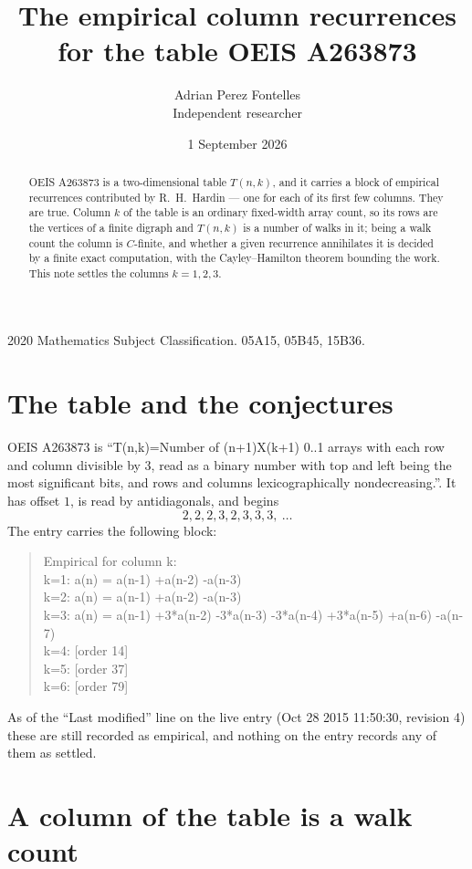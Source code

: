 \documentclass[11pt,a4paper]{article}
\title{The empirical column recurrences for the table OEIS A263873}
\author{Adrian Perez Fontelles\\ \small Independent researcher}
\date{1 September 2026}
\theoremstyle{plain}
\theoremstyle{definition}
\begin{document}
\maketitle

\begin{abstract}
OEIS A263873 is a two-dimensional table $T(n,k)$, and it carries a block of empirical
recurrences contributed by R.~H.~Hardin --- one for each of its first few columns. They are
true. Column $k$ of the table is an ordinary fixed-width array count, so its rows are the
vertices of a finite digraph and $T(n,k)$ is a number of walks in it; being a walk count the
column is $C$-finite, and whether a given recurrence annihilates it is decided by a finite
exact computation, with the Cayley--Hamilton theorem bounding the work. This note settles the columns $k=1, 2, 3$.
\end{abstract}

\noindent\small 2020 Mathematics Subject Classification. 05A15, 05B45, 15B36.\normalsize

\section{The table and the conjectures}

OEIS A263873 is ``T(n,k)=Number of (n+1)X(k+1) 0..1 arrays with each row and column divisible by 3, read as a binary number with top and left being the most significant bits, and rows and columns lexicographically nondecreasing.''. It has offset $1$, is
read by antidiagonals, and begins
\[
2, 2, 2, 3, 2, 3, 3, 3,\ \dots
\]
The entry carries the following block:
\begin{quote}\small
Empirical for column k:\\
k=1: a(n) = a(n-1) +a(n-2) -a(n-3)\\
k=2: a(n) = a(n-1) +a(n-2) -a(n-3)\\
k=3: a(n) = a(n-1) +3*a(n-2) -3*a(n-3) -3*a(n-4) +3*a(n-5) +a(n-6) -a(n-7)\\
k=4: [order 14]\\
k=5: [order 37]\\
k=6: [order 79]\\
\end{quote}
As of the ``Last modified'' line on the live entry (Oct 28 2015 11:50:30, revision 4) these are still
recorded as empirical, and nothing on the entry records any of them as settled.

\section{A column of the table is a walk count}
\end{document}
